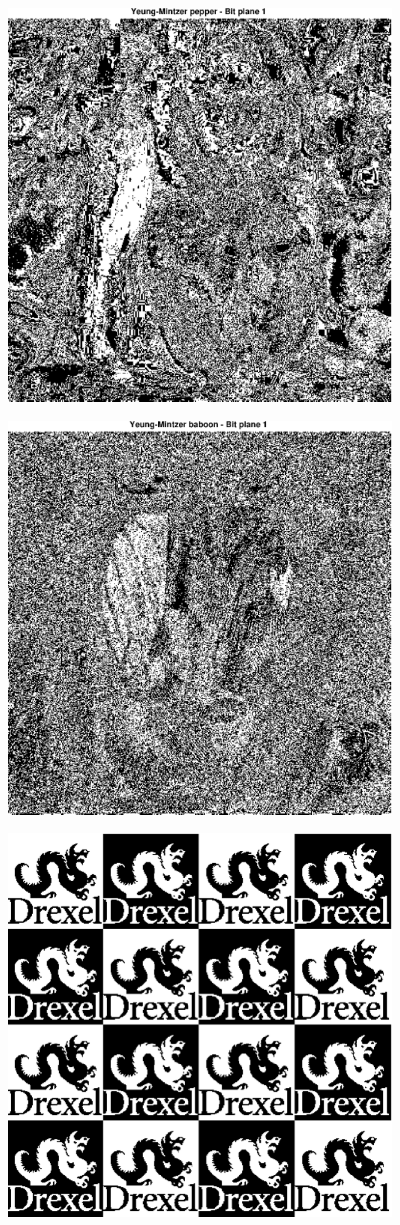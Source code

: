 \documentclass{article}
\begin{document}
    
\includegraphics [width=4in]{lab3_05.eps}

\includegraphics [width=4in]{lab3_06.eps}

\includegraphics [width=4in]{lab3_07.eps}
\end{document}
